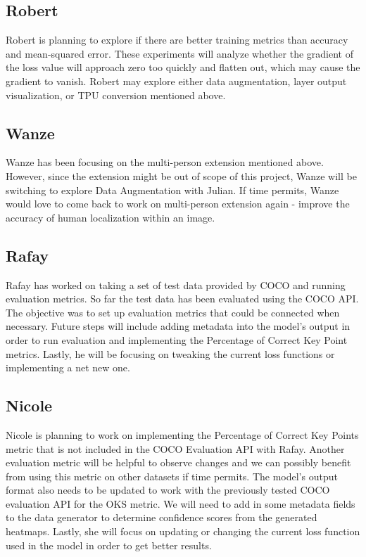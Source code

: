 \documentclass[11pt, letterpaper]{article}
\begin{document}
\subsection{Robert}
Robert is planning to explore if there are better training metrics than accuracy and mean-squared error. These experiments will analyze whether the gradient of the loss value will approach zero too quickly and flatten out, which may cause the gradient to vanish. Robert may explore either data augmentation, layer output visualization, or TPU conversion mentioned above. 
\subsection{Wanze}
Wanze has been focusing on the multi-person extension mentioned above. However, since the extension might be out of scope of this project, Wanze will be switching to explore Data Augmentation with Julian.  If time permits, Wanze would love to come back to work on  multi-person extension again - improve the accuracy of human localization within an image. 
\subsection{Rafay}
Rafay has worked on taking a set of test data provided by COCO and running evaluation metrics. So far the test data has been evaluated using the COCO API. The objective was to set up evaluation metrics that could be connected when necessary. Future steps will include adding metadata into the model’s output in order to run evaluation and implementing the Percentage of Correct Key Point metrics. Lastly, he will be focusing on tweaking the current loss functions or implementing a net new one.   
\subsection{Nicole}
Nicole is planning to work on implementing the Percentage of Correct Key Points metric that is not included in the COCO Evaluation API with Rafay. Another evaluation metric will be helpful to observe changes and we can possibly benefit from using this metric on other datasets if time permits. The model’s output format also needs to be updated to work with the previously tested COCO evaluation API for the OKS metric. We will need to add in some metadata fields to the data generator to determine confidence scores from the generated heatmaps. Lastly, she will focus on updating or changing the current loss function used in the model in order to get better results.
\end{document}
